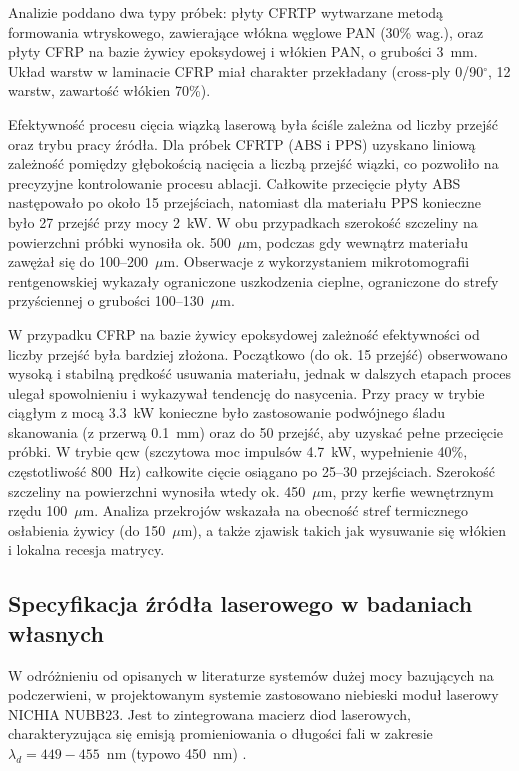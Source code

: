 \documentclass[a4paper,twoside,12pt]{book}
\begin{document}
Analizie poddano dwa typy próbek: płyty CFRTP wytwarzane metodą formowania wtryskowego, zawierające włókna węglowe PAN (30\% wag.), oraz płyty CFRP na bazie żywicy epoksydowej i włókien PAN, o grubości 3~mm. Układ warstw w laminacie CFRP miał charakter przekładany (cross-ply 0/90$^{\circ}$, 12 warstw, zawartość włókien 70\%).

Efektywność procesu cięcia wiązką laserową była ściśle zależna od liczby przejść oraz trybu pracy źródła. Dla próbek CFRTP (ABS i PPS) uzyskano liniową zależność pomiędzy głębokością nacięcia a liczbą przejść wiązki, co pozwoliło na precyzyjne kontrolowanie procesu ablacji. Całkowite przecięcie płyty ABS następowało po około 15 przejściach, natomiast dla materiału PPS konieczne było 27 przejść przy mocy 2~kW. W obu przypadkach szerokość szczeliny na powierzchni próbki wynosiła ok. 500~$\mu$m, podczas gdy wewnątrz materiału zawężał się do 100--200~$\mu$m. Obserwacje z wykorzystaniem mikrotomografii rentgenowskiej wykazały ograniczone uszkodzenia cieplne, ograniczone do strefy przyściennej o grubości 100--130~$\mu$m.

W przypadku CFRP na bazie żywicy epoksydowej zależność efektywności od liczby przejść była bardziej złożona. Początkowo (do ok. 15 przejść) obserwowano wysoką i stabilną prędkość usuwania materiału, jednak w dalszych etapach proces ulegał spowolnieniu i wykazywał tendencję do nasycenia. Przy pracy w trybie ciągłym z mocą 3.3~kW konieczne było zastosowanie podwójnego śladu skanowania (z przerwą 0.1~mm) oraz do 50 przejść, aby uzyskać pełne przecięcie próbki. W trybie qcw (szczytowa moc impulsów 4.7~kW, wypełnienie 40\%, częstotliwość 800~Hz) całkowite cięcie osiągano po 25--30 przejściach. Szerokość szczeliny na powierzchni wynosiła wtedy ok. 450~$\mu$m, przy kerfie wewnętrznym rzędu 100~$\mu$m. Analiza przekrojów wskazała na obecność stref termicznego osłabienia żywicy (do 150~$\mu$m), a także zjawisk takich jak wysuwanie się włókien i lokalna recesja matrycy.

\subsection*{Specyfikacja źródła laserowego w badaniach własnych}

W odróżnieniu od opisanych w literaturze systemów dużej mocy bazujących na podczerwieni, w projektowanym systemie zastosowano niebieski moduł laserowy NICHIA NUBB23. Jest to zintegrowana macierz diod laserowych, charakteryzująca się emisją promieniowania o długości fali w zakresie $\lambda_d = 449{-}455$~nm (typowo 450~nm) \cite{bib:datasheetNUBB23}.
\end{document}
